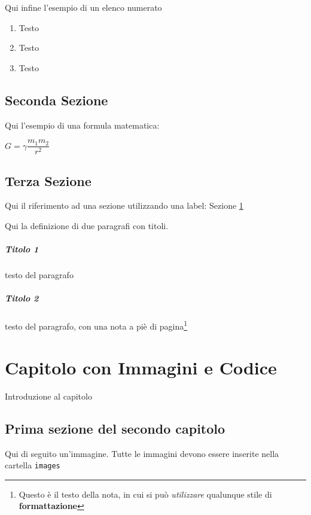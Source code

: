 Qui infine l'esempio di un elenco numerato

\begin{enumerate}
\item Testo
\item Testo
\item Testo
\end{enumerate}

\section{Seconda Sezione}\label{sec:Sezione2}

Qui l'esempio di una formula matematica:

$ G = \gamma\dfrac{m_{1}m_{2}}{r^{2}} $

\section{Terza Sezione}

Qui il riferimento ad una sezione utilizzando una label: Sezione \ref{sec:Sezione2}

Qui la definizione di due paragrafi con titoli.

\paragraph{Titolo 1} testo del paragrafo

\paragraph{Titolo 2} testo del paragrafo, con una nota a piè di pagina\footnote{Questo è il testo della nota, in cui si può \textit{utilizzare} qualunque stile di \textbf{formattazione}}



\chapter{Capitolo con Immagini e Codice}

Introduzione al capitolo

\section{Prima sezione del secondo capitolo}

Qui di seguito un'immagine. Tutte le immagini devono essere inserite nella cartella \texttt{images}

